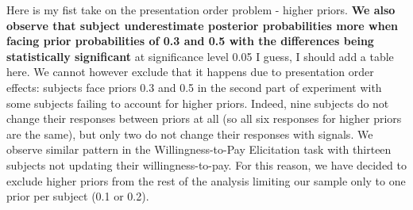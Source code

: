 \documentclass[12pt,a4paper]{article}
\newcommand{\aut}[1]{{\color{Red}#1}}
\begin{document}
\aut{Here is my fist take on the presentation order problem - higher priors.}
\textbf{We also observe that subject underestimate posterior probabilities more when facing prior probabilities of 0.3 and 0.5 with the differences being statistically significant} at significance level 0.05 \aut{I guess, I should add a table here}. We cannot however exclude that it happens due to presentation order effects: subjects face priors 0.3 and 0.5 in the second part of experiment with some subjects failing to account for higher priors. Indeed, nine subjects do not change their responses between priors at all (so all six responses for higher priors are the same), but only two do not change their responses with signals. We observe similar pattern in the Willingness-to-Pay Elicitation task with thirteen subjects not updating their willingness-to-pay. For this reason, we have decided to exclude higher priors from the rest of the analysis limiting our sample only to one prior per subject (0.1 or 0.2).
\end{document}
